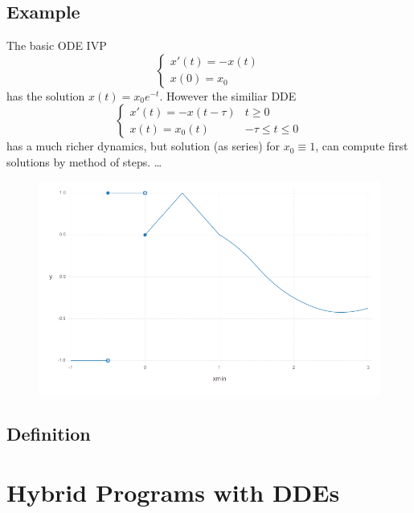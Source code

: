 \documentclass[10pt]{article}
\begin{document}
\subsection{Example}\label{example}
The basic ODE IVP
\begin{equation}
    \begin{cases}
        x'(t) = -x(t)\\
        x(0) = x_0
    \end{cases}
\end{equation}
has the solution $x(t)=x_0 e^{-t}$. However the similiar DDE
\begin{equation}
    \begin{cases}
        x'(t) = -x(t-\tau) & t\geq 0\\
        x(t) = x_0(t) & -\tau\leq t\leq 0
    \end{cases}
\end{equation}
has a much richer dynamics, but solution (as series) for $x_0\equiv 1$, can compute first solutions by method of steps. \ldots{}

\begin{figure}[h]\centering
    \includegraphics[width=\textwidth]{piecewise-initial-function.png}
	\label{fig:not-allowed}
\end{figure}

\subsection{Definition}\label{definition}

\section{Hybrid Programs with DDEs}\label{hybrid-programs-with-ddes}
\end{document}
